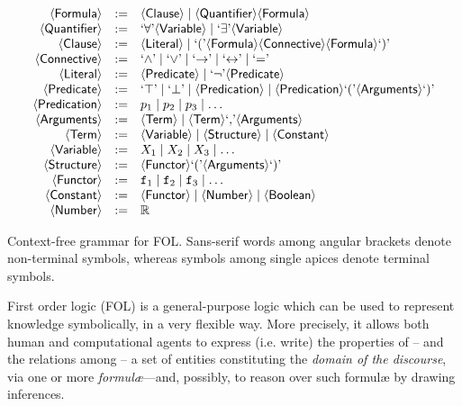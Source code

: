 \documentclass[12pt,a4paper,openright,twoside]{book}
\begin{document}
\begin{table}
    $$\begin{array}{rcl}
        \meta{Formula} & := & \meta{Clause} \mid \meta{Quantifier} \meta{Formula}
        \\
        \meta{Quantifier} & := & \terminal{\forall} \meta{Variable} \mid \terminal{\exists} \meta{Variable}
        \\
        \meta{Clause} & := & \meta{Literal} \mid \terminal{(} \meta{Formula} \meta{Connective} \meta{Formula} \terminal{)}
        \\
        \meta{Connective} & := & \terminal{\wedge} \mid \terminal{\vee} \mid \terminal{\rightarrow} \mid \terminal{\leftrightarrow} \mid \terminal{=} 
        \\ 
        \meta{Literal}  & := & \meta{Predicate} \mid \terminal{\lnot} \meta{Predicate} 
        \\
        \meta{Predicate} & := & \terminal{\top} \mid \terminal{\bot} \mid \meta{Predication} \mid \meta{Predication} \terminal{(} \meta{Arguments} \terminal{)}
        \\
        \meta{Predication} & := & p_1 \mid p_2 \mid p_3 \mid \ldots
        \\
        \meta{Arguments} & := & \meta{Term} \mid \meta{Term} \terminal{,} \meta{Arguments}
        \\
        \meta{Term} & := & \meta{Variable} \mid \meta{Structure} \mid \meta{Constant}
        \\
        \meta{Variable} & := & X_1 \mid X_2 \mid X_3 \mid \ldots
        \\
        \meta{Structure} & := & \meta{Functor} \terminal{(} \meta{Arguments} \terminal{)}
        \\
        \meta{Functor} & := & \functor{f}_1 \mid \functor{f}_2 \mid \functor{f}_3 \mid \ldots
        \\
        \meta{Constant} & := & \meta{Functor} \mid \meta{Number}\mid \meta{Boolean}
        \\
        \meta{Number} & := & \mathbb{R}
    \end{array}$$
    \caption[Context-free grammar for FOL]{Context-free grammar for FOL. Sans-serif words among angular brackets denote non-terminal symbols, whereas symbols among single apices denote terminal symbols.}
    \label{tab:fol-grammar}
\end{table}

First order logic (FOL) is a general-purpose logic which can be used to represent knowledge symbolically, in a very flexible way.
%
More precisely, it allows both human and computational agents to express (i.e. write) the properties of -- and the relations among -- a set of entities constituting the \emph{domain of the discourse}, via one or more \emph{formul\ae}---and, possibly, to reason over such formul\ae{} by drawing inferences.
\end{document}
